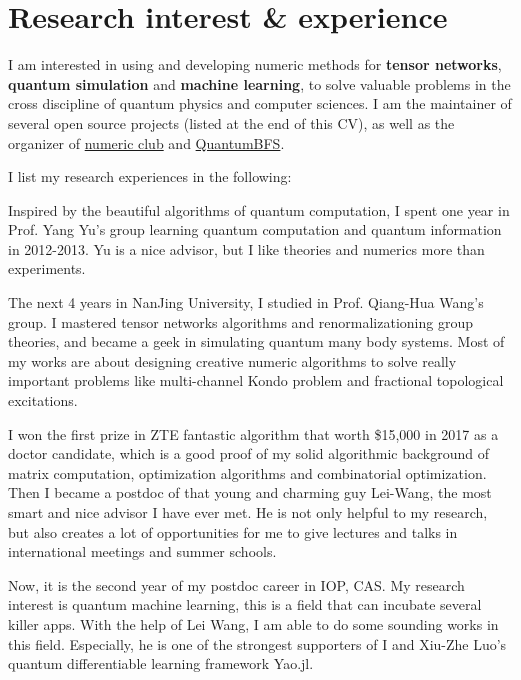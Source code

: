 \documentclass[letterpaper]{article}
\renewenvironment{itemize}{
  \begin{list}{}{
    \setlength{\leftmargin}{1.5em}
  }
}{
  \end{list}
}
\begin{document}
\section*{Research interest \& experience}
I am interested in using and developing numeric methods for \textbf{tensor networks}, \textbf{quantum simulation} and \textbf{machine learning},
to solve valuable problems in the cross discipline of quantum physics and computer sciences.
I am the maintainer of several open source projects (listed at the end of this CV), as well as the organizer of \href{http://num.v2nobel.com}{numeric club} and \href{https://github.com/QuantumBFS/}{QuantumBFS}.

I list my research experiences in the following:
\begin{itemize}
    \item [1] Inspired by the beautiful algorithms of quantum computation,
        I spent one year in Prof. Yang Yu's group learning quantum computation and quantum information in 2012-2013. Yu is a nice advisor, but I like theories and numerics more than experiments.
    \item [2] The next 4 years in NanJing University, I studied in Prof. Qiang-Hua Wang's group. I mastered tensor networks algorithms and renormalizationing group theories, and became a geek in simulating quantum many body systems. Most of my works are about designing creative numeric algorithms to solve really important problems like multi-channel Kondo problem and fractional topological excitations.
    \item [3] I won the first prize in ZTE fantastic algorithm that worth \$15,000 in 2017 as a doctor candidate, which is a good proof of my solid algorithmic background of matrix computation, optimization algorithms and combinatorial optimization. Then I became a postdoc of that young and charming guy Lei-Wang, the most smart and nice advisor I have ever met. He is not only helpful to my research, but also creates a lot of opportunities for me to give lectures and talks in international meetings and summer schools.
    \item [4] Now, it is the second year of my postdoc career in IOP, CAS. My research interest is quantum machine learning, this is a field that can incubate several killer apps. With the help of Lei Wang, I am able to do some sounding works in this field. Especially, he is one of the strongest supporters of I and Xiu-Zhe Luo's quantum differentiable learning framework Yao.jl.
\end{itemize}
\end{document}

